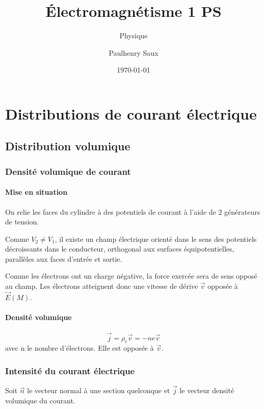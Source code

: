 \documentclass[french]{yLectureNote}
\title{Électromagnétisme 1 PS}
\subtitle{Physique}
\author{Paulhenry Saux}
\date{\today}
\renewcommand{\vec}{\overrightarrow}
\newcommand{\E}{\vec{E}(M)}
\begin{document}
\setcounter{chapter}{5}
\chapter{Distributions de courant électrique}
\section{Distribution volumique}
\subsection{Densité volumique de courant}
\subsubsection{Mise en situation}
On relie les faces du cylindre à des potentiels de courant à l'aide de 2 générateurs de tension.

Comme \(V_2\neq V_1\), il existe un champ électrique orienté dans le sens des potentiels décroissants dans le conducteur, orthogonal aux surfaces équipotentielles, parallèles aux faces d'entrée et sortie.

Comme les électrons ont un charge négative, la force exercée sera de sens opposé au champ.
Les électrons atteignent donc une vitesse de dérive \(\vec{v}\) opposée à \(\E\).
\subsubsection{Densité volumique}
\begin{definition}[DVC]
\[\vec{j} = \rho_c\vec{v} = -ne\vec{v}\] avec n le nombre d’électrons. Elle est opposée à \(\vec{v}\).
\end{definition}
%
%
%
%
\subsection{Intensité du courant électrique}
Soit \(\vec{n}\) le vecteur normal à une section quelconque et \(\vec{j}\) le vecteur densité volumique du courant.
\end{document}
